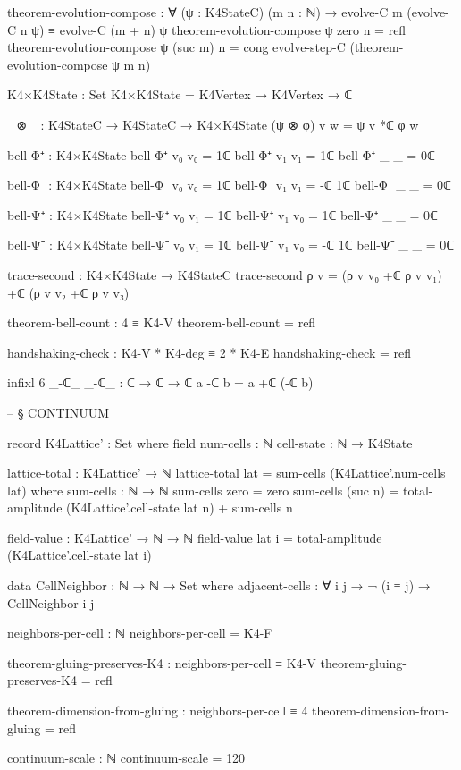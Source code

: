 \documentclass[11pt,a4paper]{book}
\begin{document}
\begin{code}
theorem-evolution-compose : ∀ (ψ : K4StateC) (m n : ℕ) →
  evolve-C m (evolve-C n ψ) ≡ evolve-C (m + n) ψ
theorem-evolution-compose ψ zero    n = refl
theorem-evolution-compose ψ (suc m) n = cong evolve-step-C (theorem-evolution-compose ψ m n)

K4×K4State : Set
K4×K4State = K4Vertex → K4Vertex → ℂ

_⊗_ : K4StateC → K4StateC → K4×K4State
(ψ ⊗ φ) v w = ψ v *ℂ φ w

bell-Φ⁺ : K4×K4State
bell-Φ⁺ v₀ v₀ = 1ℂ
bell-Φ⁺ v₁ v₁ = 1ℂ
bell-Φ⁺ _  _  = 0ℂ

bell-Φ⁻ : K4×K4State
bell-Φ⁻ v₀ v₀ = 1ℂ
bell-Φ⁻ v₁ v₁ = -ℂ 1ℂ
bell-Φ⁻ _  _  = 0ℂ

bell-Ψ⁺ : K4×K4State
bell-Ψ⁺ v₀ v₁ = 1ℂ
bell-Ψ⁺ v₁ v₀ = 1ℂ
bell-Ψ⁺ _  _  = 0ℂ

bell-Ψ⁻ : K4×K4State
bell-Ψ⁻ v₀ v₁ = 1ℂ
bell-Ψ⁻ v₁ v₀ = -ℂ 1ℂ
bell-Ψ⁻ _  _  = 0ℂ

trace-second : K4×K4State → K4StateC
trace-second ρ v = (ρ v v₀ +ℂ ρ v v₁) +ℂ (ρ v v₂ +ℂ ρ v v₃)

theorem-bell-count : 4 ≡ K4-V
theorem-bell-count = refl

handshaking-check : K4-V * K4-deg ≡ 2 * K4-E
handshaking-check = refl



infixl 6 _-ℂ_
_-ℂ_ : ℂ → ℂ → ℂ
a -ℂ b = a +ℂ (-ℂ b)


-- § CONTINUUM

record K4Lattice' : Set where
  field
    num-cells : ℕ
    cell-state : ℕ → K4State
    
lattice-total : K4Lattice' → ℕ
lattice-total lat = sum-cells (K4Lattice'.num-cells lat) 
  where
    sum-cells : ℕ → ℕ
    sum-cells zero = zero
    sum-cells (suc n) = total-amplitude (K4Lattice'.cell-state lat n) + sum-cells n

field-value : K4Lattice' → ℕ → ℕ
field-value lat i = total-amplitude (K4Lattice'.cell-state lat i)

data CellNeighbor : ℕ → ℕ → Set where
  adjacent-cells : ∀ i j → ¬ (i ≡ j) → CellNeighbor i j

neighbors-per-cell : ℕ
neighbors-per-cell = K4-F

theorem-gluing-preserves-K4 : neighbors-per-cell ≡ K4-V
theorem-gluing-preserves-K4 = refl

theorem-dimension-from-gluing : neighbors-per-cell ≡ 4
theorem-dimension-from-gluing = refl

continuum-scale : ℕ
continuum-scale = 120



\end{code}
\end{document}
